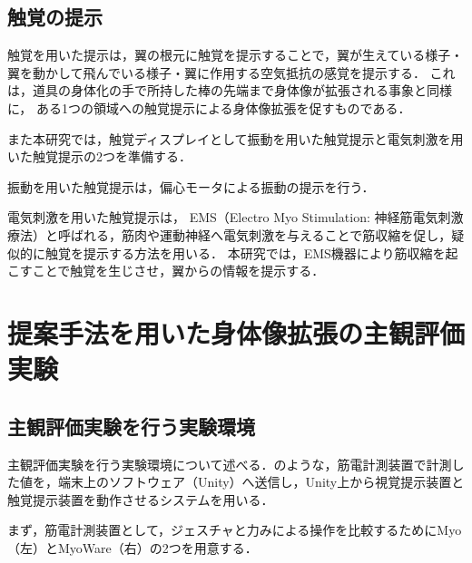 \begin{small}
    \subsection{触覚の提示} %
      触覚を用いた提示は，翼の根元に触覚を提示することで，翼が生えている様子・翼を動かして飛んでいる様子・翼に作用する空気抵抗の感覚を提示する．
      これは，道具の身体化の手で所持した棒の先端まで身体像が拡張される事象と同様に，
      ある1つの領域への触覚提示による身体像拡張を促すものである．
      
      また本研究では，触覚ディスプレイとして振動を用いた触覚提示と電気刺激を用いた触覚提示の2つを準備する．
      
      振動を用いた触覚提示は，偏心モータによる振動の提示を行う．
  
      電気刺激を用いた触覚提示は，
      EMS（Electro Myo Stimulation: 神経筋電気刺激療法）と呼ばれる，筋肉や運動神経へ電気刺激を与えることで筋収縮を促し，疑似的に触覚を提示する方法を用いる．
      本研究では，EMS機器により筋収縮を起こすことで触覚を生じさせ，翼からの情報を提示する．


\section{提案手法を用いた身体像拡張の主観評価実験}

  \subsection{主観評価実験を行う実験環境}
    
    主観評価実験を行う実験環境について述べる．のような，筋電計測装置で計測した値を，端末上のソフトウェア（Unity）へ送信し，Unity上から視覚提示装置と触覚提示装置を動作させるシステムを用いる．



    まず，筋電計測装置として，ジェスチャと力みによる操作を比較するためにMyo（左）とMyoWare（右）の2つを用意する．


\end{small}
